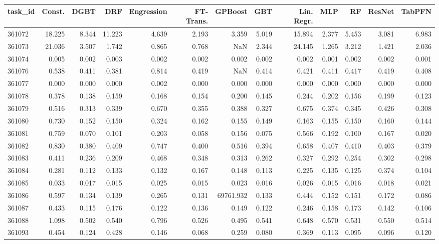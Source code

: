 \begin{tabular}{lrrrrrrrrrrrr}
\toprule
task\_id & Const. & DGBT & DRF & Engression & FT-Trans. & GPBoost & GBT & Lin. Regr. & MLP & RF & ResNet & TabPFN \\
\midrule
361072 & 18.225 & 8.344 & 11.223 & 4.639 & 2.193 & 3.359 & 5.019 & 15.894 & 2.377 & 5.453 & 3.081 & 6.983 \\
361073 & 21.036 & 3.507 & 1.742 & 0.865 & 0.768 & NaN & 2.344 & 24.145 & 1.265 & 3.212 & 1.421 & 2.036 \\
361074 & 0.005 & 0.002 & 0.003 & 0.002 & 0.002 & 0.002 & 0.002 & 0.002 & 0.001 & 0.002 & 0.002 & 0.001 \\
361076 & 0.538 & 0.411 & 0.381 & 0.814 & 0.419 & NaN & 0.414 & 0.421 & 0.411 & 0.417 & 0.419 & 0.408 \\
361077 & 0.000 & 0.000 & 0.000 & 0.002 & 0.000 & 0.000 & 0.000 & 0.000 & 0.000 & 0.000 & 0.000 & 0.000 \\
361078 & 0.378 & 0.138 & 0.159 & 0.168 & 0.154 & 0.200 & 0.145 & 0.244 & 0.202 & 0.156 & 0.199 & 0.123 \\
361079 & 0.516 & 0.313 & 0.339 & 0.670 & 0.355 & 0.388 & 0.327 & 0.675 & 0.374 & 0.345 & 0.426 & 0.308 \\
361080 & 0.730 & 0.152 & 0.150 & 0.324 & 0.162 & 0.155 & 0.149 & 0.163 & 0.155 & 0.150 & 0.160 & 0.144 \\
361081 & 0.759 & 0.070 & 0.101 & 0.203 & 0.058 & 0.156 & 0.075 & 0.566 & 0.192 & 0.100 & 0.167 & 0.020 \\
361082 & 0.830 & 0.380 & 0.409 & 0.747 & 0.400 & 0.516 & 0.394 & 0.658 & 0.407 & 0.410 & 0.403 & 0.379 \\
361083 & 0.411 & 0.236 & 0.209 & 0.468 & 0.348 & 0.313 & 0.262 & 0.327 & 0.292 & 0.254 & 0.302 & 0.298 \\
361084 & 0.281 & 0.112 & 0.133 & 0.132 & 0.167 & 0.148 & 0.113 & 0.225 & 0.135 & 0.125 & 0.374 & 0.104 \\
361085 & 0.033 & 0.017 & 0.015 & 0.025 & 0.015 & 0.023 & 0.016 & 0.026 & 0.015 & 0.016 & 0.018 & 0.021 \\
361086 & 0.597 & 0.134 & 0.139 & 0.265 & 0.131 & 69761.932 & 0.133 & 0.444 & 0.152 & 0.151 & 0.172 & 0.086 \\
361087 & 0.433 & 0.115 & 0.176 & 0.122 & 0.136 & 0.149 & 0.122 & 0.246 & 0.158 & 0.173 & 0.142 & 0.106 \\
361088 & 1.098 & 0.502 & 0.540 & 0.796 & 0.526 & 0.495 & 0.541 & 0.648 & 0.570 & 0.531 & 0.550 & 0.514 \\
361093 & 0.454 & 0.124 & 0.428 & 0.146 & 0.068 & 0.259 & 0.080 & 0.369 & 0.113 & 0.095 & 0.096 & 0.120 \\

\end{tabular}
